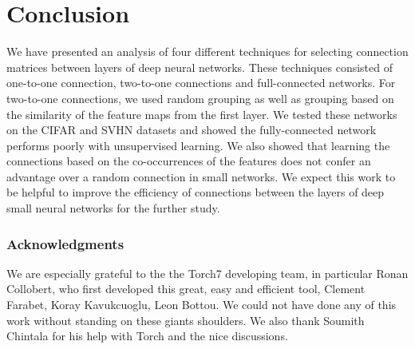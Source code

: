 \documentclass{article} %
\begin{document}
\section{Conclusion}
\label{sec-conc}

We have presented an analysis of four different techniques for selecting connection matrices between layers of deep neural networks.
These techniques consisted of one-to-one connection, two-to-one connections and full-connected networks.
For two-to-one connections, we used random grouping as well as grouping based on the similarity of the feature maps from the first layer. 
We tested these networks on the CIFAR and SVHN datasets and showed the fully-connected network performs poorly with unsupervised learning.
We also showed that learning the connections based on the co-occurrences of  the features does not confer an advantage over a random connection in small networks.
We expect this work to be helpful to improve the efficiency of connections between the layers of deep small neural networks for the further study.


\subsubsection*{Acknowledgments}
We are especially grateful to the the Torch7 developing team, in particular Ronan Collobert, who first developed this great, easy and efficient tool,
Clement Farabet, Koray Kavukcuoglu, Leon Bottou.
We could not have done any of this work without standing on these giants shoulders.
We also thank Soumith Chintala for his help with Torch and the nice discussions.



\end{document}
